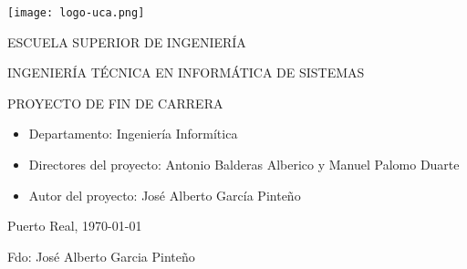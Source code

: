 


\begin{center}

  \texttt{[image: logo-uca.png]} \\

  \vspace{2.5cm}

  \Large{ESCUELA SUPERIOR DE INGENIERÍA} \\

  \vspace{1.0cm}

  \large{INGENIERÍA TÉCNICA EN INFORMÁTICA DE SISTEMAS} \\

  \vspace{2.0cm}

  \large{PROYECTO DE FIN DE CARRERA} \\

  \vspace{2.5cm}

\end{center}

\begin{itemize}
\item \large{Departamento: Ingeniería Informítica}
\item \large{Directores del proyecto: Antonio Balderas Alberico y Manuel Palomo Duarte}
\item \large{Autor del proyecto: José Alberto García Pinteño}
\end{itemize}

\vspace{0.2cm}

\begin{flushright}
  \large{Puerto Real, \today} \\

  \vspace{2.5cm}

  \large{Fdo: José Alberto Garcia Pinteño}
\end{flushright}
